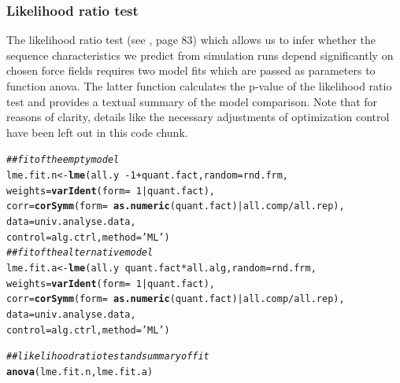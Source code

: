\documentclass{article}\usepackage[table]{xcolor}
\makeatletter
\newcommand{\hlnum}[1]{\textcolor[rgb]{0.686,0.059,0.569}{#1}}%
\newcommand{\hlstr}[1]{\textcolor[rgb]{0.192,0.494,0.8}{#1}}%
\newcommand{\hlcom}[1]{\textcolor[rgb]{0.678,0.584,0.686}{\textit{#1}}}%
\newcommand{\hlopt}[1]{\textcolor[rgb]{0,0,0}{#1}}%
\newcommand{\hlstd}[1]{\textcolor[rgb]{0.345,0.345,0.345}{#1}}%
\newcommand{\hlkwb}[1]{\textcolor[rgb]{0.69,0.353,0.396}{#1}}%
\newcommand{\hlkwc}[1]{\textcolor[rgb]{0.333,0.667,0.333}{#1}}%
\newcommand{\hlkwd}[1]{\textcolor[rgb]{0.737,0.353,0.396}{\textbf{#1}}}%
\newenvironment{kframe}{%
 \def\at@end@of@kframe{}%
 \ifinner\ifhmode%
  \def\at@end@of@kframe{\end{minipage}}%
  \begin{minipage}{\columnwidth}%
 \fi\fi%
 \def\FrameCommand##1{\hskip\@totalleftmargin \hskip-\fboxsep
 \colorbox{shadecolor}{##1}\hskip-\fboxsep
     \hskip-\linewidth \hskip-\@totalleftmargin \hskip\columnwidth}%
 \MakeFramed {\advance\hsize-\width
   \@totalleftmargin\z@ \linewidth\hsize
   \@setminipage}}%
 {\par\unskip\endMakeFramed%
 \at@end@of@kframe}
\newenvironment{knitrout}{}{} %
\renewcommand{\$}{$} %
\makeatother
\begin{document}
\subsubsection{Likelihood ratio test}
The likelihood ratio test (see \cite{Pinheiro+Bates:2000}, page 83)
which allows us to infer whether the sequence characteristics we
predict from simulation runs depend significantly on chosen force
fields requires two model fits which are passed as parameters to
function anova. The latter function calculates the p-value of the
likelihood ratio test and provides a textual summary of the model
comparison. Note that for reasons of clarity, details like the
necessary adjustments of optimization control have been left out in
this code chunk.
\begin{knitrout}
\color{fgcolor}\begin{kframe}
\begin{alltt}
\hlcom{## fit of the empty model}
\hlstd{lme.fit.n} \hlkwb{<-} \hlkwd{lme}\hlstd{(all.y}\hlopt{~-}\hlnum{1}\hlopt{+}\hlstd{quant.fact,} \hlkwc{random} \hlstd{= rnd.frm,}
                 \hlkwc{weights}\hlstd{=}\hlkwd{varIdent}\hlstd{(}\hlkwc{form}\hlstd{=}\hlopt{~}\hlnum{1}\hlopt{|}\hlstd{quant.fact),}
                 \hlkwc{corr}\hlstd{=}\hlkwd{corSymm}\hlstd{(}\hlkwc{form}\hlstd{=}\hlopt{~}\hlkwd{as.numeric}\hlstd{(quant.fact)}\hlopt{|}\hlstd{all.comp}\hlopt{/}\hlstd{all.rep),}
                 \hlkwc{data}\hlstd{=univ.analyse.data,}
                 \hlkwc{control}\hlstd{=alg.ctrl,} \hlkwc{method}\hlstd{=}\hlstr{'ML'}\hlstd{)}
\hlcom{## fit of the alternative model}
\hlstd{lme.fit.a} \hlkwb{<-} \hlkwd{lme}\hlstd{(all.y}\hlopt{~}\hlstd{quant.fact}\hlopt{*}\hlstd{all.alg,} \hlkwc{random} \hlstd{= rnd.frm,}
                 \hlkwc{weights}\hlstd{=}\hlkwd{varIdent}\hlstd{(}\hlkwc{form}\hlstd{=}\hlopt{~}\hlnum{1}\hlopt{|}\hlstd{quant.fact),}
                 \hlkwc{corr}\hlstd{=}\hlkwd{corSymm}\hlstd{(}\hlkwc{form}\hlstd{=}\hlopt{~}\hlkwd{as.numeric}\hlstd{(quant.fact)}\hlopt{|}\hlstd{all.comp}\hlopt{/}\hlstd{all.rep),}
                 \hlkwc{data}\hlstd{=univ.analyse.data,}
                 \hlkwc{control}\hlstd{=alg.ctrl,} \hlkwc{method}\hlstd{=}\hlstr{'ML'}\hlstd{)}

\hlcom{## likelihood ratio test and summary of fit}
\hlkwd{anova}\hlstd{(lme.fit.n, lme.fit.a)}
\end{alltt}
\end{kframe}
\end{knitrout}
\end{document}
